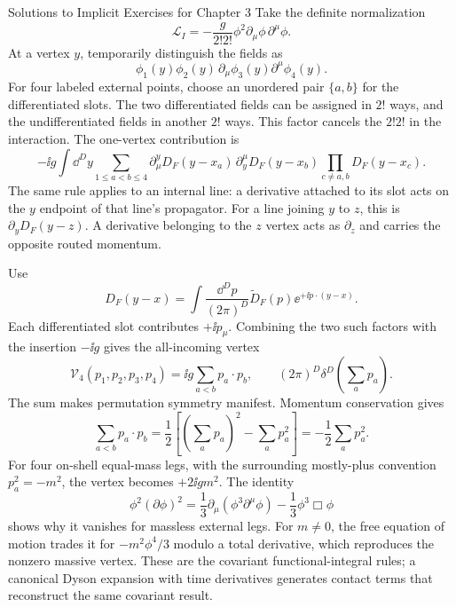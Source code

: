 \begin{bankssolutions}{Solutions to Implicit Exercises for Chapter 3}
Take the definite normalization
\[
 \mathcal L_I=-\frac{g}{2!2!}\phi^2
 \partial_\mu\phi\,\partial^\mu\phi.
\]
At a vertex $y$, temporarily distinguish the fields as
\[
 \phi_1(y)\phi_2(y)\,
 \partial_\mu\phi_3(y)\partial^\mu\phi_4(y).
\]
For four labeled external points, choose an unordered pair $\{a,b\}$ for the
differentiated slots.  The two differentiated fields can be assigned in
$2!$ ways, and the undifferentiated fields in another $2!$ ways.  This factor
cancels the $2!2!$ in the interaction.  The one-vertex contribution is
\[
 -\ii g\int\dd^D y\sum_{1\leq a<b\leq4}
 \partial_\mu^yD_F(y-x_a)\,
 \partial_y^\mu D_F(y-x_b)
 \prod_{c\ne a,b}D_F(y-x_c).
\]
The same rule applies to an internal line: a derivative attached to its slot
acts on the $y$ endpoint of that line's propagator.  For a line joining $y$
to $z$, this is $\partial_yD_F(y-z)$.  A derivative belonging to the $z$
vertex acts as $\partial_z$ and carries the opposite routed momentum.

Use
\[
 D_F(y-x)=\int\frac{\dd^D p}{(2\pi)^D}
 \widetilde D_F(p)\ee^{+\ii p\mathbin{\cdot}(y-x)}.
\]
Each differentiated slot contributes $+\ii p_\mu$.  Combining the two such
factors with the insertion $-\ii g$ gives the all-incoming vertex
\[
 \boxed{\mathcal V_4(p_1,p_2,p_3,p_4)
 =\ii g\sum_{a<b}p_a\mathbin{\cdot}p_b},
 \qquad (2\pi)^D\delta^D\!\left(\sum_a p_a\right).
\]
The sum makes permutation symmetry manifest.  Momentum conservation gives
\[
 \sum_{a<b}p_a\mathbin{\cdot}p_b
 =\frac12\left[\left(\sum_a p_a\right)^2-\sum_a p_a^2\right]
 =-\frac12\sum_a p_a^2.
\]
For four on-shell equal-mass legs, with the surrounding mostly-plus convention
$p_a^2=-m^2$, the vertex becomes $+2\ii g m^2$.  The
identity
\[
 \phi^2(\partial\phi)^2
 =\frac13\partial_\mu(\phi^3\partial^\mu\phi)
  -\frac13\phi^3\Box\phi
\]
shows why it vanishes for massless external legs.  For $m\ne0$, the free
equation of motion trades it for $-m^2\phi^4/3$ modulo a total derivative,
which reproduces the nonzero massive vertex.  These are the covariant
functional-integral rules; a canonical Dyson expansion with time derivatives
generates contact terms that reconstruct the same covariant result.


\end{bankssolutions}
